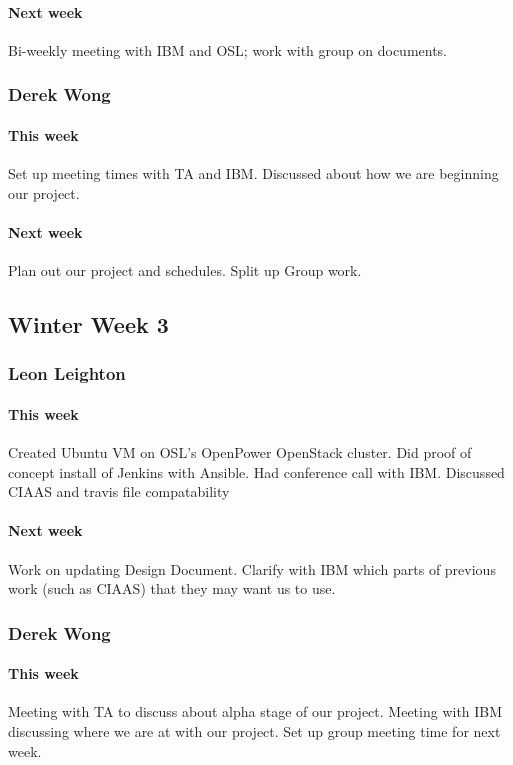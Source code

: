 \documentclass[10pt,letterpaper,onecolumn,draftclsnofoot]{IEEEtran}
\begin{document}
\paragraph{Next week}Bi-weekly meeting with IBM and OSL; work with group on documents.


\subsubsection{Derek Wong}
\paragraph{This week}Set up meeting times with TA and IBM\@.
Discussed about how we are beginning our project.
\paragraph{Next week}Plan out our project and schedules.
Split up Group work.

\subsection{Winter Week 3}
\subsubsection{Leon Leighton}
\paragraph{This week}Created Ubuntu VM on OSL's OpenPower OpenStack cluster.  
Did proof of concept install of Jenkins with Ansible.  
Had conference call with IBM. Discussed CIAAS and travis file compatability 
\paragraph{Next week}Work on updating Design Document. 
Clarify with IBM which parts of previous work (such as CIAAS) that they may want us to use.


\subsubsection{Derek Wong}
\paragraph{This week}Meeting with TA to discuss about alpha stage of our project.  
Meeting with IBM discussing where we are at with our project.   
Set up group meeting time for next week.
\end{document}
